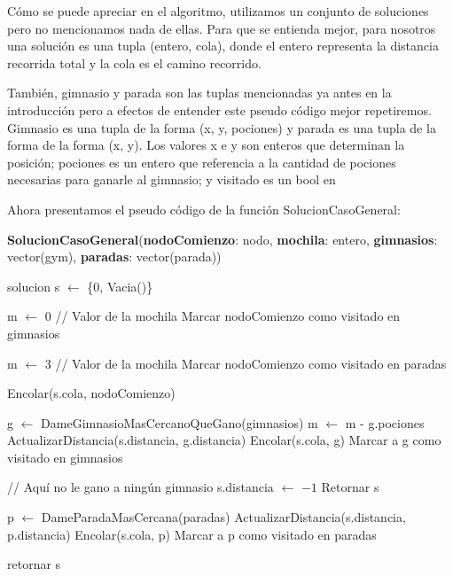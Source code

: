 Cómo se puede apreciar en el algoritmo, utilizamos un conjunto de soluciones pero no mencionamos nada de ellas. Para que se entienda mejor, para nosotros una solución es una tupla (entero, cola), donde el entero representa la distancia recorrida total y la cola es el camino recorrido.

También, gimnasio y parada son las tuplas mencionadas ya antes en la introducción pero a efectos de entender este pseudo código mejor repetiremos. Gimnasio es una tupla de la forma (x, y, pociones) y parada es una tupla de la forma de la forma (x, y). Los valores x e y son enteros que determinan la posición; pociones es un entero que referencia a la cantidad de pociones necesarias para ganarle al gimnasio; y visitado es un bool en

Ahora presentamos el pseudo código de la función SolucionCasoGeneral:

\begin{algorithm}[H]
\label{}
\caption{\textbf{SolucionCasoGeneral}(\textbf{nodoComienzo}: nodo, \textbf{mochila}: entero, \textbf{gimnasios}: vector(gym), \textbf{paradas}: vector(parada))}
\begin{algorithmic}[1]

\State solucion s $\leftarrow$ \{0, Vacia()\}


	\State m $\leftarrow$ 0  // Valor de la mochila
	\State Marcar nodoComienzo como visitado en gimnasios

\Else

	\State m $\leftarrow$ 3  // Valor de la mochila
	\State Marcar nodoComienzo como visitado en paradas

\EndIf

\State Encolar(s.cola, nodoComienzo)


		\State g $\leftarrow$ DameGimnasioMasCercanoQueGano(gimnasios)
		\State m $\leftarrow$ m - g.pociones
		\State ActualizarDistancia(s.distancia, g.distancia)
		\State Encolar(s.cola, g)
		\State Marcar a g como visitado en gimnasios

		\State // Aquí no le gano a ningún gimnasio
		\State s.distancia $\leftarrow$ $-1$
		\State Retornar s
	
	\Else

		\State p $\leftarrow$ DameParadaMasCercana(paradas)
		\State ActualizarDistancia(s.distancia, p.distancia)
		\State Encolar(s.cola, p)
		\State Marcar a p como visitado en paradas

	\EndIf

\EndFor

\State retornar s

\medskip
\Statex \underline{}
\end{algorithmic}
\end{algorithm}

